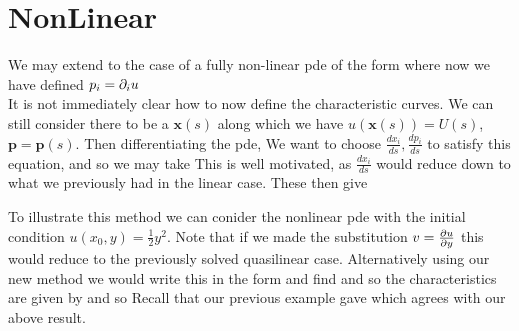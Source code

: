\documentclass{article}
\begin{document}
\section{NonLinear}
We may extend to the case of a fully non-linear pde of the form 
where now we have defined $p_i = \del_i u$ \\
It is not immediately clear how to now define the characteristic curves. We can still consider there to be a $\bm{x}(s)$ along which we have $u(\bm{x}(s)) = U(s)$, $\bm{p}= \bm{p}(s)$. Then differentiating the pde, 
We want to choose $\frac{dx_i}{ds},\frac{dp_i}{ds}$ to satisfy this equation, and so we may take 
This is well motivated, as $\frac{dx_i}{ds}$ would reduce down to what we previously had in the linear case. These then give

\begin{example}
To illustrate this method we can conider the nonlinear pde 
with the initial condition $u(x_0,y) = \frac{1}{2} y^2$. Note that if we made the substitution $v=\pd[u]{y}$ this would reduce to the previously solved quasilinear case. Alternatively using our new method we would write this in the form
and find 
and so the characteristics are given by 
and so 
Recall that our previous example gave 
which agrees with our above result. 
\end{example}
\end{document}
